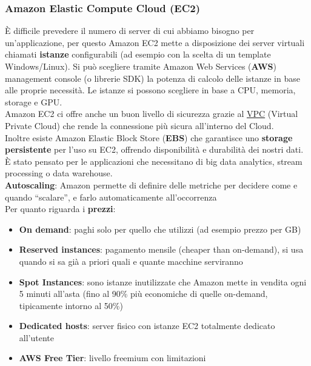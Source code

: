 \subsubsection{Amazon Elastic Compute Cloud (EC2)}
È difficile prevedere il numero di server di cui abbiamo bisogno per un'applicazione, per questo Amazon EC2 mette a disposizione dei server virtuali chiamati \textbf{istanze} configurabili (ad esempio con la scelta di un template Windows/Linux). Si può scegliere tramite Amazon Web Services (\textbf{AWS}) management console (o librerie SDK) la potenza di calcolo delle istanze in base alle proprie necessità. Le istanze si possono scegliere in base a CPU, memoria, storage e GPU.\\
Amazon EC2 ci offre anche un buon livello di sicurezza grazie al \href{https://aws.amazon.com/it/vpc/}{VPC} (Virtual Private Cloud) che rende la connessione più sicura all’interno del Cloud.\\
Inoltre esiste Amazon Elastic Block Store (\textbf{EBS}) che garantisce uno \textbf{storage persistente} per l’uso su EC2, offrendo disponibilità e durabilità dei nostri dati. È stato pensato per le applicazioni che necessitano di big data analytics, stream processing o data warehouse.\\
\textbf{Autoscaling}: Amazon permette di definire delle metriche per decidere come e quando “scalare”, e farlo automaticamente all’occorrenza\\
Per quanto riguarda i \textbf{prezzi}:
\begin{itemize}
    \item \textbf{On demand}: paghi solo per quello che utilizzi (ad esempio prezzo per GB)
    \item \textbf{Reserved instances}: pagamento mensile (cheaper than on-demand), si usa quando si sa già a priori quali e quante macchine serviranno
    \item \textbf{Spot Instances}: sono istanze inutilizzate che Amazon mette in vendita ogni 5 minuti all’asta (fino al 90\% più economiche di quelle on-demand, tipicamente intorno al 50\%)
    \item \textbf{Dedicated hosts}: server fisico con istanze EC2 totalmente dedicato all'utente
    \item \textbf{AWS Free Tier}: livello freemium con limitazioni
\end{itemize}


